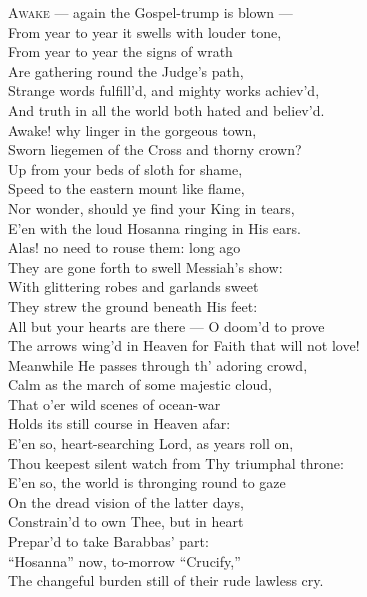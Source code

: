 \textsc{Awake} — again the Gospel-trump is blown — \\
 From year to year it swells with louder tone, \\
 From year to year the signs of wrath \\
 Are gathering round the Judge’s path, \\
 Strange words fulfill’d, and mighty works achiev’d, \\
 And truth in all the world both hated and believ’d. \\
  Awake! why linger in the gorgeous town, \\
 Sworn liegemen of the Cross and thorny crown? \\
 Up from your beds of sloth for shame, \\
 Speed to the eastern mount like flame, \\
 Nor wonder, should ye find your King in tears, \\
 E’en with the loud Hosanna ringing in His ears. \\
  Alas! no need to rouse them: long ago \\
 They are gone forth to swell Messiah’s show: \\
 With glittering robes and garlands sweet \\
 They strew the ground beneath His feet: \\
 All but your hearts are there — O doom’d to prove \\
 The arrows wing’d in Heaven for Faith that will not love! \\
  Meanwhile He passes through th’ adoring crowd, \\
 Calm as the march of some majestic cloud, \\
 That o’er wild scenes of ocean-war \\
 Holds its still course in Heaven afar: \\
 E’en so, heart-searching Lord, as years roll on, \\
 Thou keepest silent watch from Thy triumphal throne: \\
  E’en so, the world is thronging round to gaze \\
 On the dread vision of the latter days, \\
 Constrain’d to own Thee, but in heart \\
 Prepar’d to take Barabbas’ part: \\
 “Hosanna” now, to-morrow “Crucify,” \\
 The changeful burden still of their rude lawless cry. \\
